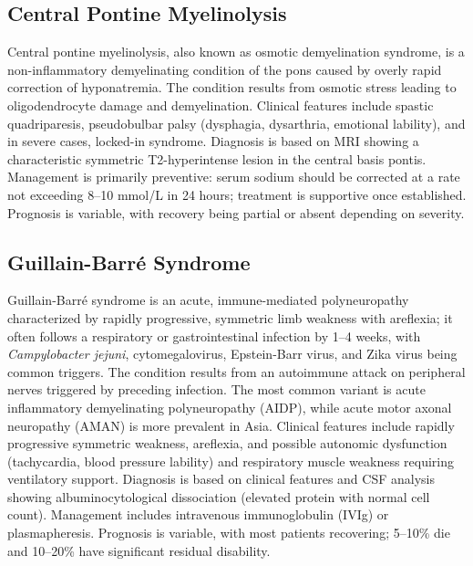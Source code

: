 \subsection{Central Pontine Myelinolysis}
\label{sec:Central Pontine Myelinolysis}
Central pontine myelinolysis, also known as osmotic demyelination syndrome, is a non-inflammatory demyelinating condition of the pons caused by overly rapid correction of hyponatremia. The condition results from osmotic stress leading to oligodendrocyte damage and demyelination. Clinical features include spastic quadriparesis, pseudobulbar palsy (dysphagia, dysarthria, emotional lability), and in severe cases, locked-in syndrome. Diagnosis is based on MRI showing a characteristic symmetric T2-hyperintense lesion in the central basis pontis. Management is primarily preventive: serum sodium should be corrected at a rate not exceeding 8--10 mmol/L in 24 hours; treatment is supportive once established. Prognosis is variable, with recovery being partial or absent depending on severity.

\subsection{Guillain-Barr\'{e} Syndrome}
\label{sec:Guillain-Barré Syndrome}
Guillain-Barr\'{e} syndrome is an acute, immune-mediated polyneuropathy characterized by rapidly progressive, symmetric limb weakness with areflexia; it often follows a respiratory or gastrointestinal infection by 1--4 weeks, with \textit{Campylobacter jejuni}, cytomegalovirus, Epstein-Barr virus, and Zika virus being common triggers. The condition results from an autoimmune attack on peripheral nerves triggered by preceding infection. The most common variant is acute inflammatory demyelinating polyneuropathy (AIDP), while acute motor axonal neuropathy (AMAN) is more prevalent in Asia. Clinical features include rapidly progressive symmetric weakness, areflexia, and possible autonomic dysfunction (tachycardia, blood pressure lability) and respiratory muscle weakness requiring ventilatory support. Diagnosis is based on clinical features and CSF analysis showing albuminocytological dissociation (elevated protein with normal cell count). Management includes intravenous immunoglobulin (IVIg) or plasmapheresis. Prognosis is variable, with most patients recovering; 5--10\% die and 10--20\% have significant residual disability.

